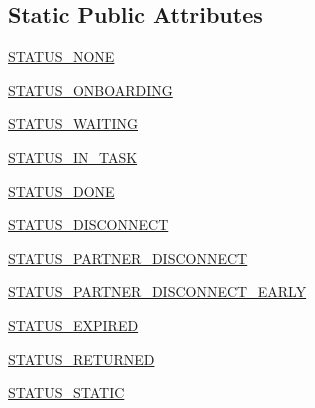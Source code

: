 \subsection*{Static Public Attributes}
\begin{DoxyCompactItemize}
\item 
\hyperlink{classparlai_1_1mturk_1_1core_1_1dev_1_1agents_1_1AssignState_ad1c4d2da31e8abd8f38481fb86f0fd35}{S\+T\+A\+T\+U\+S\+\_\+\+N\+O\+NE}
\item 
\hyperlink{classparlai_1_1mturk_1_1core_1_1dev_1_1agents_1_1AssignState_ac3de258e8f9d0226e10632a1e7052d65}{S\+T\+A\+T\+U\+S\+\_\+\+O\+N\+B\+O\+A\+R\+D\+I\+NG}
\item 
\hyperlink{classparlai_1_1mturk_1_1core_1_1dev_1_1agents_1_1AssignState_ac2b34bb88d211e9091e818db5029d548}{S\+T\+A\+T\+U\+S\+\_\+\+W\+A\+I\+T\+I\+NG}
\item 
\hyperlink{classparlai_1_1mturk_1_1core_1_1dev_1_1agents_1_1AssignState_a45845a7b322994f3b07390f7b28d7091}{S\+T\+A\+T\+U\+S\+\_\+\+I\+N\+\_\+\+T\+A\+SK}
\item 
\hyperlink{classparlai_1_1mturk_1_1core_1_1dev_1_1agents_1_1AssignState_ad3a2d8e831a998f33a8715374b977295}{S\+T\+A\+T\+U\+S\+\_\+\+D\+O\+NE}
\item 
\hyperlink{classparlai_1_1mturk_1_1core_1_1dev_1_1agents_1_1AssignState_a2fd6cfcc27f580a73fbdf095cb30a1f5}{S\+T\+A\+T\+U\+S\+\_\+\+D\+I\+S\+C\+O\+N\+N\+E\+CT}
\item 
\hyperlink{classparlai_1_1mturk_1_1core_1_1dev_1_1agents_1_1AssignState_a60e48f9624d4c6a483fc12497272a5e9}{S\+T\+A\+T\+U\+S\+\_\+\+P\+A\+R\+T\+N\+E\+R\+\_\+\+D\+I\+S\+C\+O\+N\+N\+E\+CT}
\item 
\hyperlink{classparlai_1_1mturk_1_1core_1_1dev_1_1agents_1_1AssignState_ad0b9ef4b56d802cae1be71bf87f02c40}{S\+T\+A\+T\+U\+S\+\_\+\+P\+A\+R\+T\+N\+E\+R\+\_\+\+D\+I\+S\+C\+O\+N\+N\+E\+C\+T\+\_\+\+E\+A\+R\+LY}
\item 
\hyperlink{classparlai_1_1mturk_1_1core_1_1dev_1_1agents_1_1AssignState_a54097f0a2dee189fcf2554f58c4db2f2}{S\+T\+A\+T\+U\+S\+\_\+\+E\+X\+P\+I\+R\+ED}
\item 
\hyperlink{classparlai_1_1mturk_1_1core_1_1dev_1_1agents_1_1AssignState_aace2c49a8ef45336b28abd1c9ea019f0}{S\+T\+A\+T\+U\+S\+\_\+\+R\+E\+T\+U\+R\+N\+ED}
\item 
\hyperlink{classparlai_1_1mturk_1_1core_1_1dev_1_1agents_1_1AssignState_a7604714d529f2a08a9e091a31b369dc5}{S\+T\+A\+T\+U\+S\+\_\+\+S\+T\+A\+T\+IC}
\end{DoxyCompactItemize}



